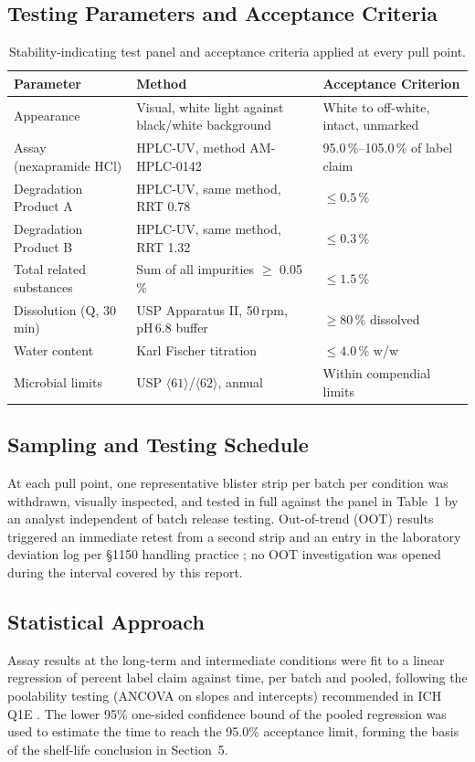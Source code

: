 \subsection{Testing Parameters and Acceptance Criteria}

\begin{table}[htbp]
\centering
\small
\begin{tabularx}{\textwidth}{@{}l X l@{}}
\toprule
\textbf{Parameter} & \textbf{Method} & \textbf{Acceptance Criterion} \\
\midrule
Appearance & Visual, white light against black/white background & White to off-white, intact, unmarked \\
Assay (nexapramide HCl) & HPLC-UV, method AM-HPLC-0142 & 95.0\,\%--105.0\,\% of label claim \\
Degradation Product A & HPLC-UV, same method, RRT 0.78 & \(\leq 0.5\,\%\) \\
Degradation Product B & HPLC-UV, same method, RRT 1.32 & \(\leq 0.3\,\%\) \\
Total related substances & Sum of all impurities \(\geq\) 0.05\,\% & \(\leq 1.5\,\%\) \\
Dissolution (Q, 30 min) & USP Apparatus II, 50\,rpm, pH\,6.8 buffer & \(\geq 80\,\%\) dissolved \\
Water content & Karl Fischer titration & \(\leq 4.0\,\%\) w/w \\
Microbial limits & USP \(\langle 61 \rangle\)/\(\langle 62 \rangle\), annual & Within compendial limits \\
\bottomrule
\end{tabularx}
\caption{Stability-indicating test panel and acceptance criteria applied at every pull point.}
\end{table}

\subsection{Sampling and Testing Schedule}
At each pull point, one representative blister strip per batch per condition was
withdrawn, visually inspected, and tested in full against the panel in Table~1 by an
analyst independent of batch release testing. Out-of-trend (OOT) results triggered an
immediate retest from a second strip and an entry in the laboratory deviation log per
\S1150 handling practice \citep{usp1150}; no OOT investigation was opened during the
interval covered by this report.

\subsection{Statistical Approach}
Assay results at the long-term and intermediate conditions were fit to a linear
regression of percent label claim against time, per batch and pooled, following the
poolability testing (ANCOVA on slopes and intercepts) recommended in ICH\,Q1E
\citep{ich_q1e}. The lower 95\% one-sided confidence bound of the pooled regression was
used to estimate the time to reach the 95.0\% acceptance limit, forming the basis of the
shelf-life conclusion in Section~5.
